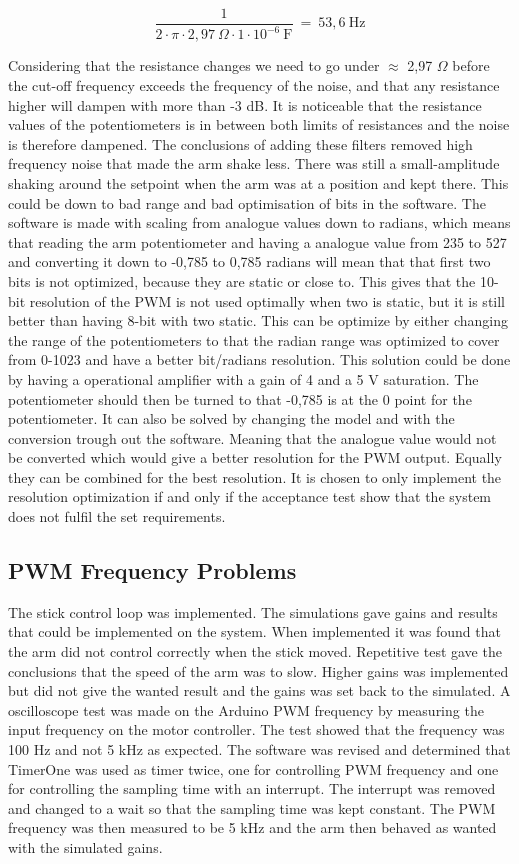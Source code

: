 \begin{equation}
\frac{1}{2\cdot \pi \cdot 2,97\ \Omega \cdot 1 \cdot 10^{-6}\  \text{F}}\ =\ 53,6\ \text{Hz}
\end{equation}

Considering that the resistance changes we need to go under $\approx$ 2,97 $\Omega$ before the cut-off frequency exceeds the frequency of the noise, and that any resistance higher will dampen with more than -3 dB. It is noticeable that the resistance values of the potentiometers is in between both limits of resistances and the noise is therefore dampened. The conclusions of adding these filters removed high frequency noise that made the arm shake less. There was still a small-amplitude shaking around the setpoint when the arm was at a position and kept there. This could be down to bad range and bad optimisation of bits in the software. The software is made with scaling from analogue values down to radians, which means that reading the arm potentiometer and having a analogue value from 235 to 527 and converting it down to -0,785 to 0,785 radians will mean that that first two bits is not optimized, because they are static or close to. This gives that the 10-bit resolution of the PWM is not used optimally when two is static, but it is still better than having 8-bit with two static. This can be optimize by either changing the range of the potentiometers to that the radian range was optimized to cover from 0-1023 and have a better bit/radians resolution. This solution could be done by having a operational amplifier with a gain of 4 and a 5 V saturation. The potentiometer should then be turned to that -0,785 is at the 0 point for the potentiometer. It can also be solved by changing the model and with the conversion trough out the software. Meaning that the analogue value would not be converted which would give a better resolution for the PWM output. Equally they can be combined for the best resolution. It is chosen to only implement the resolution optimization if and only if the acceptance test show that the system does not fulfil the set requirements.

\subsection{PWM Frequency Problems}
The stick control loop was implemented. The simulations gave gains and results that could be implemented on the system. When implemented it was found that the arm did not control correctly when the stick moved. Repetitive test gave the conclusions that the speed of the arm was to slow. Higher gains was implemented but did not give the wanted result and the gains was set back to the simulated. A oscilloscope test was made on the Arduino PWM frequency by measuring the input frequency on the motor controller. The test showed that the frequency was 100 Hz and not 5 kHz as expected. The software was revised and determined that TimerOne was used as timer twice, one for controlling PWM frequency and one for controlling the sampling time with an interrupt. The interrupt was removed and changed to a wait so that the sampling time was kept constant. The PWM frequency was then measured to be 5 kHz and the arm then behaved as wanted with the simulated gains.    

